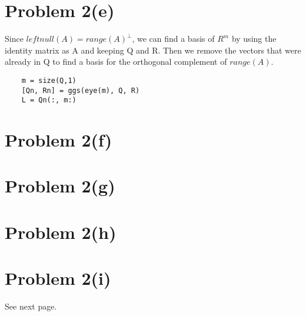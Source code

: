 \documentclass{article}
\begin{document}
\section*{Problem 2(e)}

Since $leftnull(A) = range(A)^{\perp}$, we can find a basis of $R^m$ by using the identity matrix as A and keeping Q and R. Then we remove the vectors that were already in Q to find a basis for the orthogonal complement of $range(A)$.

\begin{verbatim}
    m = size(Q,1)
    [Qn, Rn] = ggs(eye(m), Q, R)
    L = Qn(:, m:)
\end{verbatim}

\section*{Problem 2(f)}


\section*{Problem 2(g)}


\section*{Problem 2(h)}


\section*{Problem 2(i)}

See next page.

\end{document}
